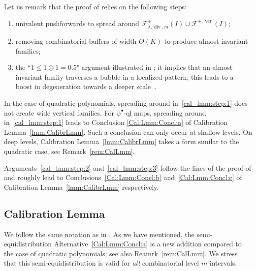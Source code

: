 \documentclass{amsart}
\newcommand{\1}{{\mathbb 1 }}
\renewcommand{\div}{{\operatorname{div}}}
\newcommand{\Fam}{{\mathcal F}}
\newcommand\ver{{\operatorname{ver}}}
\theoremstyle{remark}
\numberwithin{equation}{section}
\theoremstyle{definition}
\begin{document}
Let us remark that the proof of \cite[Calibration Lemma 9.1]{DL22} relies on the following steps:
\begin{enumerate}[label=\text{(\Alph*)},font=\normalfont,leftmargin=*]
    \item\label{cal_lmm:step:1} univalent pushforwards to spread around $\Fam_{\lambda,\div, m}^+(I)\cup \Fam^{+,\ver}(I)$;
    \item \label{cal_lmm:step:2} removing combinatorial buffers of width $O(K)$ to produce almost invariant families; 
    \item \label{cal_lmm:step:3}  the ``$1\le 1\oplus 1=0.5$" argument illustrated in \cite[Figure~16]{DL22}; it implies that an almost invariant family traverses a bubble in a localized pattern; this leads to a boost in degeneration towards a deeper scale~\cite[Claim 6 in \S9]{DL22}.
\end{enumerate}
In the case of quadratic polynomials, spreading around in~\ref{cal_lmm:step:1} does not create wide vertical families. For $\psi^\bullet$-ql maps, spreading around in~\ref{cal_lmm:step:1} leads to Conclusion \ref{Cal:Lmm:Concl:a} of Calibration Lemma~\ref{lmm:CalibrLmm}. Such a conclusion can only occur at shallow levels. On deep levels, Calibration Lemma~\ref{lmm:CalibrLmm} takes a form similar to the quadratic case, see Remark~\ref{rem:CalLmm}. 

Arguments~\ref{cal_lmm:step:2} and~\ref{cal_lmm:step:3} follow the lines of the proof of \cite[Calibration Lemma 9.1]{DL22} and roughly lead to Conclusions~\ref{Cal:Lmm:Concl:b} and~\ref{Cal:Lmm:Concl:c} of Calibration Lemma~\ref{lmm:CalibrLmm} respectively.     



\subsection{Calibration Lemma}\label{ss:calibrationlem}
We follow the same notation as in \cite[\S 9]{DL22}. As we have mentioned, the semi-equidistribution Alternative~\ref{Cal:Lmm:Concl:a} is a new addition compared to the case of quadratic polynomials; see also Reamrk~\ref{rem:CalLmm}. We stress that this semi-equidistribution is valid for \emph{all} combinatorial level $m$ intervals. 
\end{document}
